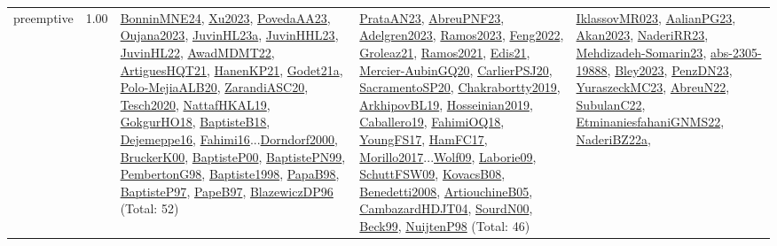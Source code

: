 {\begin{longtable}{p{3cm}r>{\raggedright\arraybackslash}p{6cm}>{\raggedright\arraybackslash}p{6cm}>{\raggedright\arraybackslash}p{8cm}}
\index{preemptive}\index{Concepts!preemptive}preemptive &  1.00 & \hyperref[detail:BonninMNE24]{BonninMNE24}, \hyperref[detail:Xu2023]{Xu2023}, \hyperref[detail:PovedaAA23]{PovedaAA23}, \hyperref[detail:Oujana2023]{Oujana2023}, \hyperref[detail:JuvinHL23a]{JuvinHL23a}, \hyperref[detail:JuvinHHL23]{JuvinHHL23}, \hyperref[detail:JuvinHL22]{JuvinHL22}, \hyperref[detail:AwadMDMT22]{AwadMDMT22}, \hyperref[detail:ArtiguesHQT21]{ArtiguesHQT21}, \hyperref[detail:HanenKP21]{HanenKP21}, \hyperref[detail:Godet21a]{Godet21a}, \hyperref[detail:Polo-MejiaALB20]{Polo-MejiaALB20}, \hyperref[detail:ZarandiASC20]{ZarandiASC20}, \hyperref[detail:Tesch2020]{Tesch2020}, \hyperref[detail:NattafHKAL19]{NattafHKAL19}, \hyperref[detail:GokgurHO18]{GokgurHO18}, \hyperref[detail:BaptisteB18]{BaptisteB18}, \hyperref[detail:Dejemeppe16]{Dejemeppe16}, \hyperref[detail:Fahimi16]{Fahimi16}...\hyperref[detail:Dorndorf2000]{Dorndorf2000}, \hyperref[detail:BruckerK00]{BruckerK00}, \hyperref[detail:BaptisteP00]{BaptisteP00}, \hyperref[detail:BaptistePN99]{BaptistePN99}, \hyperref[detail:PembertonG98]{PembertonG98}, \hyperref[detail:Baptiste1998]{Baptiste1998}, \hyperref[detail:PapaB98]{PapaB98}, \hyperref[detail:BaptisteP97]{BaptisteP97}, \hyperref[detail:PapeB97]{PapeB97}, \hyperref[detail:BlazewiczDP96]{BlazewiczDP96} (Total: 52) & \hyperref[detail:PrataAN23]{PrataAN23}, \hyperref[detail:AbreuPNF23]{AbreuPNF23}, \hyperref[detail:Adelgren2023]{Adelgren2023}, \hyperref[detail:Ramos2023]{Ramos2023}, \hyperref[detail:Feng2022]{Feng2022}, \hyperref[detail:Groleaz21]{Groleaz21}, \hyperref[detail:Ramos2021]{Ramos2021}, \hyperref[detail:Edis21]{Edis21}, \hyperref[detail:Mercier-AubinGQ20]{Mercier-AubinGQ20}, \hyperref[detail:CarlierPSJ20]{CarlierPSJ20}, \hyperref[detail:SacramentoSP20]{SacramentoSP20}, \hyperref[detail:Chakrabortty2019]{Chakrabortty2019}, \hyperref[detail:ArkhipovBL19]{ArkhipovBL19}, \hyperref[detail:Hosseinian2019]{Hosseinian2019}, \hyperref[detail:Caballero19]{Caballero19}, \hyperref[detail:FahimiOQ18]{FahimiOQ18}, \hyperref[detail:YoungFS17]{YoungFS17}, \hyperref[detail:HamFC17]{HamFC17}, \hyperref[detail:Morillo2017]{Morillo2017}...\hyperref[detail:Wolf09]{Wolf09}, \hyperref[detail:Laborie09]{Laborie09}, \hyperref[detail:SchuttFSW09]{SchuttFSW09}, \hyperref[detail:KovacsB08]{KovacsB08}, \hyperref[detail:Benedetti2008]{Benedetti2008}, \hyperref[detail:ArtiouchineB05]{ArtiouchineB05}, \hyperref[detail:CambazardHDJT04]{CambazardHDJT04}, \hyperref[detail:SourdN00]{SourdN00}, \hyperref[detail:Beck99]{Beck99}, \hyperref[detail:NuijtenP98]{NuijtenP98} (Total: 46) & \hyperref[detail:IklassovMR023]{IklassovMR023}, \hyperref[detail:AalianPG23]{AalianPG23}, \hyperref[detail:Akan2023]{Akan2023}, \hyperref[detail:NaderiRR23]{NaderiRR23}, \hyperref[detail:Mehdizadeh-Somarin23]{Mehdizadeh-Somarin23}, \hyperref[detail:abs-2305-19888]{abs-2305-19888}, \hyperref[detail:Bley2023]{Bley2023}, \hyperref[detail:PenzDN23]{PenzDN23}, \hyperref[detail:YuraszeckMC23]{YuraszeckMC23}, \hyperref[detail:AbreuN22]{AbreuN22}, \hyperref[detail:SubulanC22]{SubulanC22}, \hyperref[detail:EtminaniesfahaniGNMS22]{EtminaniesfahaniGNMS22}, \hyperref[detail:NaderiBZ22a]{NaderiBZ22a}, 
\end{longtable}}
